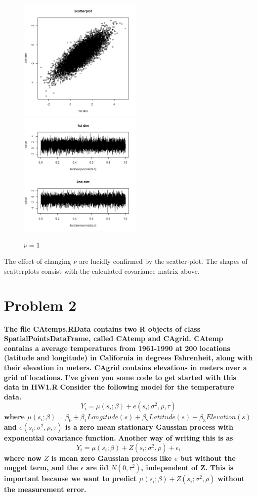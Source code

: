 \documentclass{article}
\begin{document}
\begin{figure}[!h]
    \caption{$\nu=0.5$}
    \centering
    \includegraphics[height=6cm]{prob1_test4_oneprocess_scatter.png}
    \includegraphics[height=6cm]{prob1_test4_oneprocess_traceplot.png}
    \caption{$\nu=1$}
\end{figure}


The effect of changing $\nu$ are lucidly confirmed by the scatter-plot.
The shapes of scatterplots consist with the calculated covariance matrix above.


\newpage
\section{Problem 2}
\textbf{
The file CAtemps.RData contains two R objects of class SpatialPointsDataFrame, called CAtemp and CAgrid.
CAtemp contains a average temperatures from 1961-1990 at 200 locations (latitude and longitude) in California in degrees Fahrenheit, along with their elevation in meters.
CAgrid contains elevations in meters over a grid of locations.
I've given you some code to get started with this data in HW1.R
}
\textbf{
Consider the following model for the temperature data.
\[Y_i = \mu(s_i;\beta) + e(s_i; \sigma^2, \rho, \tau)\]
where \(\mu(s_i;\beta)=\beta_0+\beta_1 Longitude(s) + \beta_2 Latitude(s)
+\beta_3 Elevation(s)\) and \(e(s_i;\sigma^2,\rho,\tau)\) is a zero mean stationary Gaussian process with
exponential covariance function.
}
\textbf{
Another way of writing this is as
\[Y_i = \mu(s_i;\beta) + Z(s_i; \sigma^2, \rho) + \epsilon_i\]
where now $Z$ is mean zero Gaussian process like $e$ but without the nugget term,
and the $\epsilon$ are iid $N(0,\tau^2)$, independent of Z.
This is important because we want to predict \(\mu(s_i;\beta)+Z(s_i;\sigma^2,\rho)\) without the measurement error.
}
\end{document}
